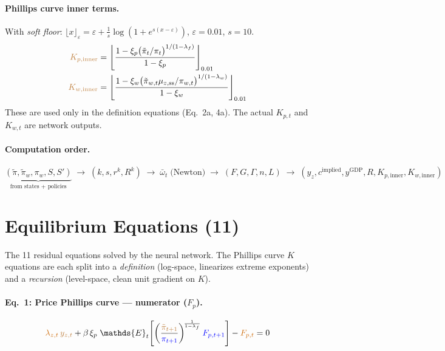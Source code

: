 \documentclass[11pt]{article}
\begin{document}
\paragraph{Phillips curve inner terms.}
With \emph{soft floor}: $\lfloor x \rfloor_\varepsilon = \varepsilon + \frac{1}{s}\log(1+e^{s(x-\varepsilon)})$,\;
$\varepsilon = 0.01$, $s=10$.
\begin{align*}
  \textcolor{brown}{K_{p,\text{inner}}} &= \left\lfloor
    \frac{1 - \xi_p\bigl(\tilde\pi_t/\pi_t\bigr)^{1/(1-\lambda_f)}}{1-\xi_p}
  \right\rfloor_{0.01}
  \\
  \textcolor{brown}{K_{w,\text{inner}}} &= \left\lfloor
    \frac{1 - \xi_w\bigl(\tilde\pi_{w,t}\mu_{z,\text{ss}}/\pi_{w,t}\bigr)^{1/(1-\lambda_w)}}{1-\xi_w}
  \right\rfloor_{0.01}
\end{align*}
These are used only in the definition equations (Eq.~2a, 4a).
The actual $K_{p,t}$ and $K_{w,t}$ are network outputs.

\paragraph{Computation order.}
\begin{equation*}
  \underbrace{(\tilde\pi,\tilde\pi_w,\pi_w,S,S')}_{\text{from states + policies}}
  \;\to\; (k, s, r^k, R^k)
  \;\to\; \bar\omega_t\;\text{(Newton)}
  \;\to\; (F, G, \Gamma, n, L)
  \;\to\; (y_z, c^{\text{implied}}, y^{\text{GDP}}, R, K_{p,\text{inner}}, K_{w,\text{inner}})
\end{equation*}


\section{Equilibrium Equations (11)}
\label{sec:equations}

The 11 residual equations solved by the neural network.
The Phillips curve $K$ equations are each split into a \emph{definition}
(log-space, linearizes extreme exponents) and a \emph{recursion}
(level-space, clean unit gradient on $K$).

\setcounter{equation}{0}

\paragraph{Eq.~1: Price Phillips curve --- numerator ($F_p$).}
\begin{equation}
  \textcolor{orange!80!black}{\lambda_{z,t}}\,\textcolor{brown}{y_{z,t}}
  + \beta\,\xi_p\;\mathds{E}_t\!\left[
    \left(\frac{\textcolor{brown}{\tilde\pi_{t+1}}}{\textcolor{blue}{\pi_{t+1}}}\right)^{\!\frac{1}{1-\lambda_f}}
    \textcolor{blue}{F_{p,t+1}}
  \right]
  - \textcolor{orange!80!black}{F_{p,t}} = 0
\end{equation}
\end{document}
